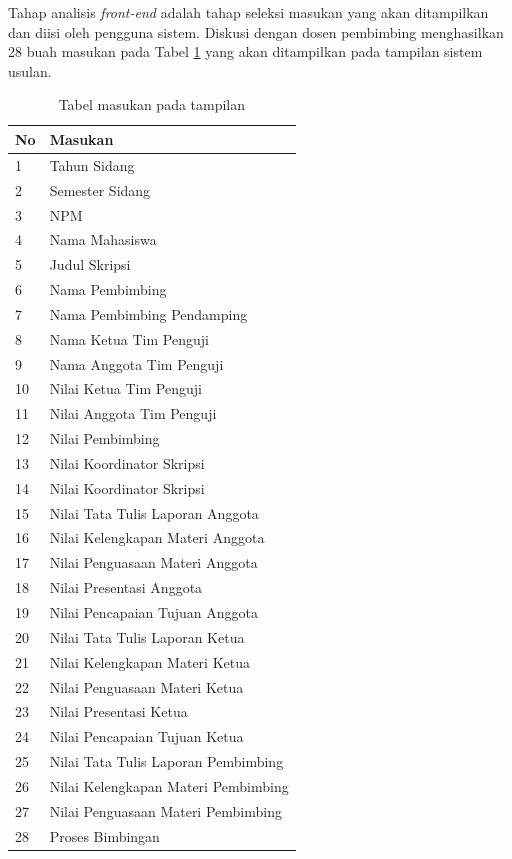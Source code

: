 	Tahap analisis \textit{front-end} adalah tahap seleksi masukan yang akan ditampilkan dan diisi oleh pengguna sistem. Diskusi dengan dosen pembimbing menghasilkan 28 buah masukan pada Tabel \ref{tabel: masukan} yang akan ditampilkan pada tampilan sistem usulan. 
	\begin{table}[H]
		\centering
		\caption{Tabel masukan pada tampilan}
		\label{tabel: masukan}
		\begin{tabular}{| m{0.75cm} | m{10cm} |}
			\hline
			No & Masukan\\
			\hline
			1 & Tahun Sidang\\
			\hline
			2 & Semester Sidang\\
			\hline
			3 & NPM\\
			\hline
			4 & Nama Mahasiswa\\
			\hline
			5 & Judul Skripsi\\
			\hline
			6 & Nama Pembimbing\\
			\hline
			7 & Nama Pembimbing Pendamping\\
			\hline
			8 & Nama Ketua Tim Penguji\\
			\hline
			9 & Nama Anggota Tim Penguji\\
			\hline
			10 & Nilai Ketua Tim Penguji\\
			\hline
			11 & Nilai Anggota Tim Penguji\\
			\hline
			12 & Nilai Pembimbing\\
			\hline
			13 & Nilai Koordinator Skripsi\\
			\hline
			14 & Nilai Koordinator Skripsi\\
			\hline
			15 & Nilai Tata Tulis Laporan Anggota\\
			\hline
			16 & Nilai Kelengkapan Materi Anggota\\
			\hline
			17 & Nilai Penguasaan Materi Anggota\\
			\hline
			18 & Nilai Presentasi Anggota\\
			\hline
			19 & Nilai Pencapaian Tujuan Anggota\\
			\hline
			20 & Nilai Tata Tulis Laporan Ketua\\
			\hline
			21 & Nilai Kelengkapan Materi Ketua\\
			\hline
			22 & Nilai Penguasaan Materi Ketua\\
			\hline
			23 & Nilai Presentasi Ketua\\
			\hline
			24 & Nilai Pencapaian Tujuan Ketua\\
			\hline
			25 & Nilai Tata Tulis Laporan Pembimbing\\
			\hline
			26 & Nilai Kelengkapan Materi Pembimbing\\
			\hline
			27 & Nilai Penguasaan Materi Pembimbing\\
			\hline
			28 & Proses Bimbingan\\
			\hline
		\end{tabular}
	\end{table}

